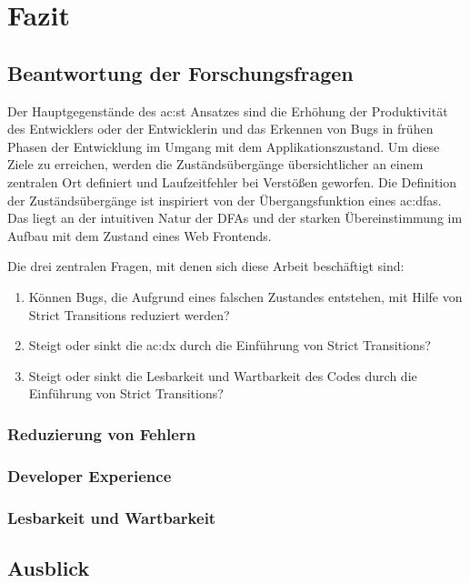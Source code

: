 \chapter{Fazit} \label{ch:fazit}

\section{Beantwortung der Forschungsfragen}

Der Hauptgegenstände des \acrlong{ac:st} Ansatzes sind die Erhöhung der Produktivität des Entwicklers oder der Entwicklerin und das Erkennen von Bugs in frühen Phasen der Entwicklung im Umgang mit dem Applikationszustand. Um diese Ziele zu erreichen, werden die Zuständsübergänge übersichtlicher an einem zentralen Ort definiert und Laufzeitfehler bei Verstößen geworfen. Die Definition der Zuständsübergänge ist inspiriert von der Übergangsfunktion eines \acrshort{ac:dfa}s. Das liegt an der intuitiven Natur der DFAs und der starken Übereinstimmung im Aufbau mit dem Zustand eines Web Frontends.

Die drei zentralen Fragen, mit denen sich diese Arbeit beschäftigt sind:

\begin{enumerate}
  \item Können Bugs, die Aufgrund eines falschen Zustandes entstehen, mit Hilfe von Strict Transitions reduziert werden?
  \item Steigt oder sinkt die \acrshort{ac:dx} durch die Einführung von Strict Transitions?
  \item Steigt oder sinkt die Lesbarkeit und Wartbarkeit des Codes durch die Einführung von Strict Transitions?
\end{enumerate}

\subsection{Reduzierung von Fehlern}

\subsection{Developer Experience}

\subsection{Lesbarkeit und Wartbarkeit}

\section{Ausblick}